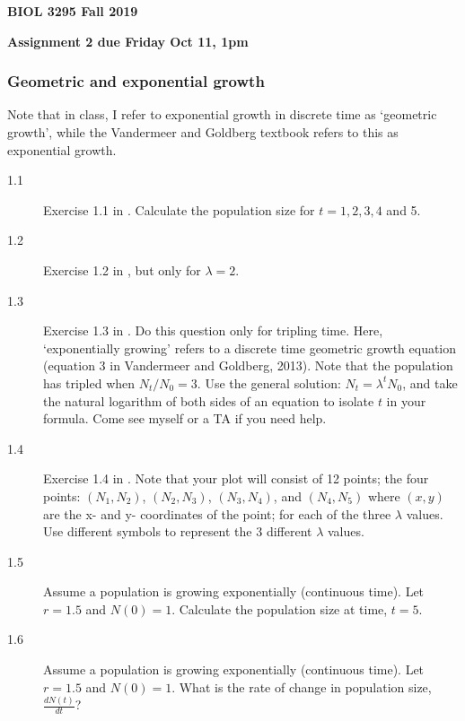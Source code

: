 \documentclass[10pt, oneside]{article}   	%
\begin{document}
\textbf{BIOL 3295 Fall 2019}

\textbf{Assignment 2 due Friday Oct 11, 1pm}

\subsubsection*{Geometric and exponential growth}
Note that in class, I refer to exponential growth in discrete time as `geometric growth', while the Vandermeer and Goldberg textbook refers to this as exponential growth.

\begin{description}
\item[1.1] Exercise 1.1 in \cite{vandermeer}. Calculate the population size for $t = 1, 2, 3, 4$ and 5.
\item[1.2] Exercise 1.2 in \cite{vandermeer}, but only for $\lambda = 2$.
\item[1.3] Exercise 1.3 in \cite{vandermeer}. Do this question only for tripling time. Here, `exponentially growing' refers to a discrete time geometric growth equation (equation 3 in Vandermeer and Goldberg, 2013). Note that the population has tripled when $N_{t}/N_0 = 3$. Use the general solution: $N_t = \lambda^t N_0$, and take the natural logarithm of both sides of an equation to isolate $t$ in your formula. Come see myself or a TA if you need help. 
\item[1.4] Exercise 1.4 in \cite{vandermeer}. Note that your plot will consist of 12 points; the four points: $(N_1, N_2)$, $(N_2, N_3)$, $(N_3, N_4)$, and $(N_4, N_5)$ where $(x,y)$ are the x- and y- coordinates of the point; for each of the three $\lambda$ values. Use different symbols to represent the 3 different $\lambda$ values.
\item[1.5] Assume a population is growing exponentially (continuous time). Let $r=1.5$ and $N(0)=1$. Calculate the population size at time, $t=5$. 
\item[1.6] Assume a population is growing exponentially (continuous time). Let $r=1.5$ and $N(0)=1$. What is the rate of change in population size, $\frac{dN(t)}{dt}$?
\end{description}
\end{document}
